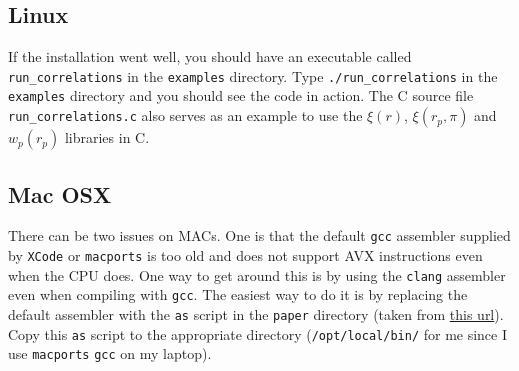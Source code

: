\documentclass[12pt,titlepage]{article}
\newcommand{\xir}{\ensuremath{{\xi(r)}}\xspace}
\newcommand{\wprp}{\ensuremath{{w_p(r_p)}}\xspace}
\newcommand{\xirppi}{\ensuremath{{\xi(r_p,\pi)}}\xspace}
\newcommand{\clang}{{\texttt{clang}}\xspace}
\newcommand{\gcc}{{\texttt{gcc}}\xspace}
\begin{document}
\subsection{Linux}
If the installation went well, you should have an executable called \texttt{run\_correlations} in the \texttt{examples} directory. Type \texttt{./run\_correlations} 
in the \texttt{examples} directory and you should see the code in action. The C source file \texttt{run\_correlations.c} also serves as an example to 
use the \xir, \xirppi and \wprp libraries in C. 

\subsection{Mac OSX}\label{section:mac}
There can be two issues on MACs. One is that the default \gcc assembler supplied by \texttt{XCode} or \texttt{macports} is too old and does not support AVX instructions 
even when the CPU does. One way to get around this is by using the \clang assembler even when compiling with \gcc. The easiest way to do it is by replacing the 
default assembler with the \texttt{as} script in the \texttt{paper} directory (taken from \href{https://gist.github.com/ancapdev/8059572}{this url}). Copy this
\texttt{as} script to the appropriate directory (\texttt{/opt/local/bin/} for me since I use \texttt{macports} \gcc on my laptop).
\end{document}
